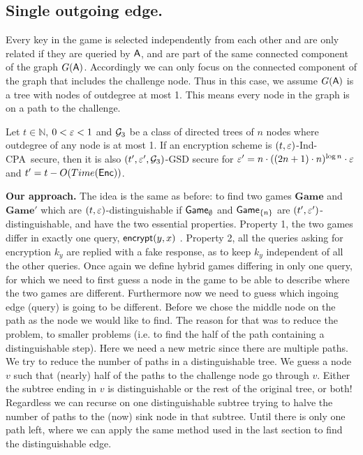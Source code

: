 \documentclass{article}
\newcommand{\tcpa}{$(t,\eps)$-Ind-CPA}
\def\A{{\sf A}}
\newcommand{\encrypt}{{\sf encrypt}}
\newcommand{\game}{{\sf Game}}
\newcommand{\dgame}{{\mathbf{Game}}}
\begin{document}
\subsection{Single outgoing edge.}
Every key in the game is selected independently from each other and are only related if they are queried by $\A$, and are part of the same connected component of the graph $G(\A)$. Accordingly we can only focus on the connected component of the graph that includes the challenge node. Thus in this case, we assume $G(\A)$ is a tree with nodes of outdegree at most 1. This means every node in the graph is on a path to the challenge. \\

\begin{theorem}\label{thm:Min-1out}
Let $t \in \mathbb{N}$, $0<\varepsilon<1$ and ${\cal G}_3$  be a class of directed trees of $n$ nodes where outdegree of any node is at most 1. If an encryption scheme is \tcpa~secure, then it is also $(t',\varepsilon',{\cal G}_3)$-GSD secure for $\varepsilon'=n\cdot ((2n+1)\cdot n)^{\log n} \cdot \varepsilon$ and $t'=t-O(Time({\sf Enc}))$.
\end{theorem}


  \textbf{Our approach.}
The idea is the same as before: to find two games $\dgame$ and $\dgame'$ which are $(t,\varepsilon)$-distinguishable if $\game_{\emptyset}$ and $\game_{\{n\}}$ are $(t',\varepsilon')$-distinguishable, and have the two essential properties. Property 1, the two games differ in exactly one query, $\encrypt(y,x)$ . Property 2, all the queries asking for encryption $k_y$ are replied with a fake response, as to keep $k_y$ independent of all the other queries. Once again we define hybrid games differing in only one query, for which we need to first guess a node in the game to be able to describe where the two games are different. Furthermore now we need to guess which ingoing edge (query) is  going to be different. Before we chose the middle node on the path as the node  we would like to find. The reason for that was to reduce the problem, to smaller problems (i.e. to find the half of the path containing a distinguishable step). Here we need a new metric since there are multiple paths. We try to reduce the number of paths in a distinguishable tree. We guess a node $v$ such that (nearly) half of the paths to the challenge node go through $v$. Either the subtree ending in $v$ is distinguishable or the rest of the original tree,  or both! Regardless we can recurse on one distinguishable subtree trying to halve the number of paths to the (now) sink node in that subtree. Until there is only one path left, where we can apply the same method used in the last section to find the distinguishable edge. \\
\end{document}
